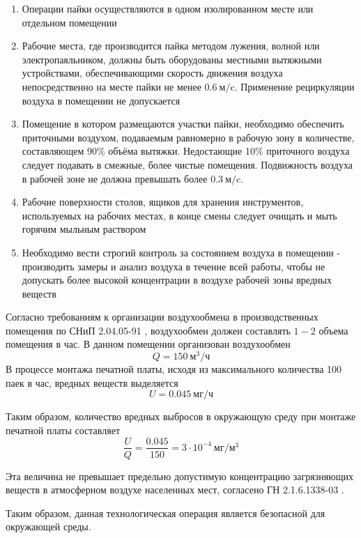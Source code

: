 \begin{enumerate}
    \item Операции пайки осуществляются в одном изолированном месте или отдельном помещении
    \item Рабочие места, где производится пайка методом лужения, волной или
        электропаяльником, должны быть оборудованы местными вытяжными устройствами,
        обеспечивающими скорость движения воздуха непосредственно на месте пайки
        не менее $0.6 ~\text{м}/\text{c}$. Применение рециркуляции воздуха в
        помещении не допускается
    \item Помещение в котором размещаются участки пайки, необходимо обеспечить
        приточными воздухом, подаваемым равномерно в рабочую зону в количестве,
        составляющем 90\% объёма вытяжки. Недостающие 10\% приточного воздуха следует
        подавать в смежные, более чистые помещения. Подвижность воздуха в рабочей
        зоне не должна превышать более $0.3 ~\text{м}/\text{c}$.
    \item Рабочие поверхности столов, ящиков для хранения инструментов, используемых
        на рабочих местах, в конце смены следует очищать и мыть горячим мыльным раствором
    \item Необходимо вести строгий контроль за состоянием воздуха в помещении -
        производить замеры и анализ воздуха в течение всей работы, чтобы не
        допускать более высокой концентрации в воздухе рабочей зоны вредных веществ
\end{enumerate}

Согласно требованиям к организации воздухообмена в производственных помещения
по СНиП 2.04.05-91 \cite{ecology_snip_04_05_95}, воздухообмен должен составлять
$1 - 2$ объема помещения в час. В данном помещении организован воздухообмен
$$
    Q = 150 ~\text{м}^3/\text{ч}
$$
В процессе монтажа печатной платы, исходя из максимального количества 100 паек
в час, вредных веществ выделяется
$$
    U = 0.045 ~\text{мг}/\text{ч}
$$

Таким образом, количество вредных выбросов в окружающую среду при монтаже
печатной платы составляет
$$
    \frac{U}{Q} = \frac{0.045}{150} = 3 \cdot 10^{-4} ~\text{мг}/\text{м}^3
$$

Эта величина не превышает предельно допустимую концентрацию загрязняющих веществ
в атмосферном воздухе населенных мест, согласено ГН 2.1.6.1338-03 \cite{ecology_hygiene_norm_1338_03}.

Таким образом, данная технологическая операция является безопасной для окружающей среды.
